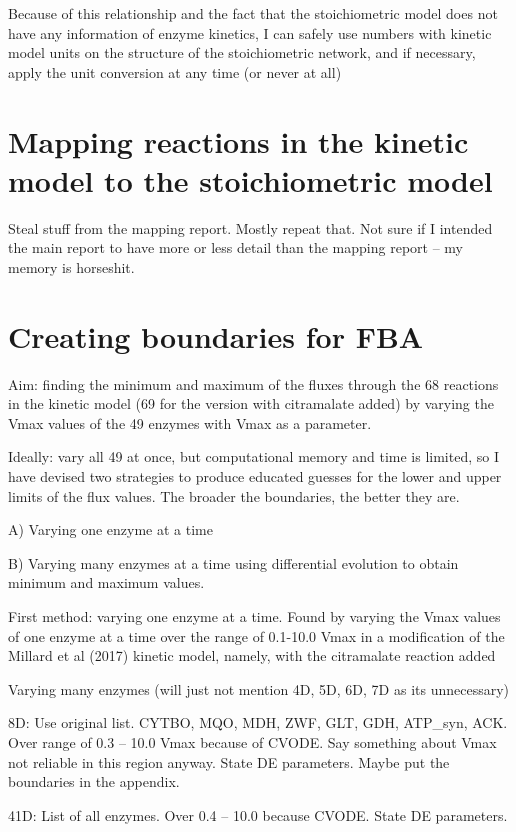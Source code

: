\documentclass[parskip=full]{scrreprt}
\begin{document}
Because of this relationship and the fact that the stoichiometric model does not have any information of enzyme kinetics, I can safely use numbers with kinetic model units on the structure of the stoichiometric network, and if necessary, apply the unit conversion at any time (or never at all)

\section{Mapping reactions in the kinetic model to the stoichiometric model}
\label{sec:mapping}

Steal stuff from the mapping report. Mostly repeat that. Not sure if I intended the main report to have more or less detail than the mapping report -- my memory is horseshit.

\section{Creating boundaries for FBA}
\label{sec:bounds}

Aim: finding the minimum and maximum of the fluxes through the 68 reactions in the kinetic model (69 for the version with citramalate added) by varying the Vmax values of the 49 enzymes with Vmax as a parameter.

Ideally: vary all 49 at once, but computational memory and time is limited, so I have devised two strategies to produce educated guesses for the lower and upper limits of the flux values. The broader the boundaries, the better they are.

A) Varying one enzyme at a time

B) Varying many enzymes at a time using differential evolution to obtain minimum and maximum values.

First method: varying one enzyme at a time. Found by varying the Vmax values of one enzyme at a time over the range of 0.1-10.0 Vmax in a modification of the Millard et al (2017) kinetic model, namely, with the citramalate reaction added

Varying many enzymes (will just not mention 4D, 5D, 6D, 7D as its unnecessary)

8D: Use original list. CYTBO, MQO, MDH, ZWF, GLT, GDH, ATP\_syn, ACK. Over range of 0.3 -- 10.0 Vmax because of CVODE. Say something about Vmax not reliable in this region anyway. State DE parameters. Maybe put the boundaries in the appendix.

41D: List of all enzymes. Over 0.4 -- 10.0 because CVODE. State DE parameters.
\end{document}

